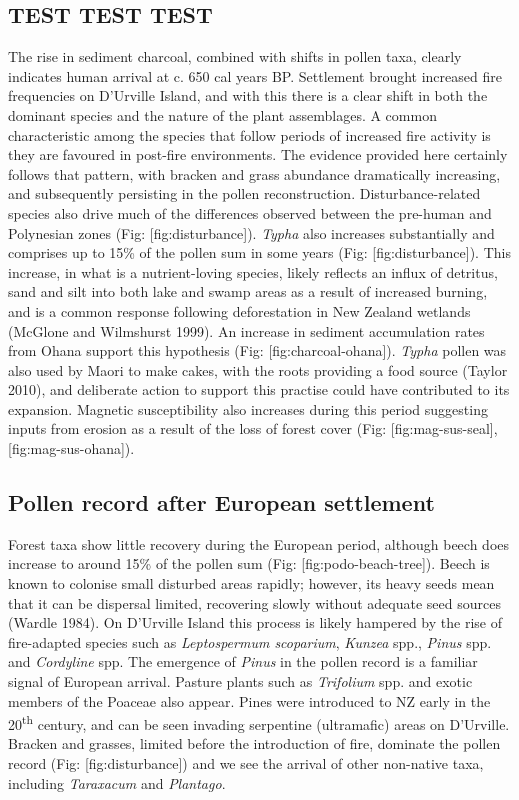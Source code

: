 \documentclass[]{article}
\begin{document}
\subsection{TEST TEST TEST}\label{test-test-test}

The rise in sediment charcoal, combined with shifts in pollen taxa, clearly indicates human arrival at c. 650 cal years BP. Settlement brought increased fire frequencies on D'Urville Island, and with this there is a clear shift in both the dominant species and the nature of the plant assemblages. A common characteristic among the species that follow periods of increased fire activity is they are favoured in post-fire environments. The evidence provided here certainly follows that pattern, with bracken and grass abundance dramatically increasing, and subsequently persisting in the pollen reconstruction. Disturbance-related species also drive much of the differences observed between the pre-human and Polynesian zones (Fig: {[}fig:disturbance{]}). \emph{Typha} also increases substantially and comprises up to 15\% of the pollen sum in some years (Fig: {[}fig:disturbance{]}). This increase, in what is a nutrient-loving species, likely reflects an influx of detritus, sand and silt into both lake and swamp areas as a result of increased burning, and is a common response following deforestation in New Zealand wetlands (McGlone and Wilmshurst 1999). An increase in sediment accumulation rates from Ohana support this hypothesis (Fig: {[}fig:charcoal-ohana{]}). \emph{Typha} pollen was also used by Maori to make cakes, with the roots providing a food source (Taylor 2010), and deliberate action to support this practise could have contributed to its expansion. Magnetic susceptibility also increases during this period suggesting inputs from erosion as a result of the loss of forest cover (Fig: {[}fig:mag-sus-seal{]}, {[}fig:mag-sus-ohana{]}).

\subsection{Pollen record after European settlement}\label{pollen-record-after-european-settlement}

Forest taxa show little recovery during the European period, although beech does increase to around 15\% of the pollen sum (Fig: {[}fig:podo-beach-tree{]}). Beech is known to colonise small disturbed areas rapidly; however, its heavy seeds mean that it can be dispersal limited, recovering slowly without adequate seed sources (Wardle 1984). On D'Urville Island this process is likely hampered by the rise of fire-adapted species such as \emph{Leptospermum scoparium}, \emph{Kunzea} spp., \emph{Pinus} spp. and \emph{Cordyline} spp. The emergence of \emph{Pinus} in the pollen record is a familiar signal of European arrival. Pasture plants such as \emph{Trifolium} spp. and exotic members of the Poaceae also appear. Pines were introduced to NZ early in the 20\textsuperscript{th} century, and can be seen invading serpentine (ultramafic) areas on D'Urville. Bracken and grasses, limited before the introduction of fire, dominate the pollen record (Fig: {[}fig:disturbance{]}) and we see the arrival of other non-native taxa, including \emph{Taraxacum} and \emph{Plantago}.
\end{document}

